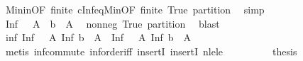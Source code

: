\begin{isabellebody}
\ Min{\isacharunderscore}{\kern0pt}in{\isacharbrackleft}{\kern0pt}OF\ finite{\isacharbrackright}{\kern0pt}\ cInf{\isacharunderscore}{\kern0pt}eq{\isacharunderscore}{\kern0pt}Min{\isacharbrackleft}{\kern0pt}OF\ finite{\isacharbrackright}{\kern0pt}\ True\ partition\ \isamarkupfalse%
\ simp\isanewline
\ \ \ \ \ \ \isamarkupfalse%
\ \isamarkupfalse%
\ {\isachardoublequoteopen}Inf\ {\isacharparenleft}{\kern0pt}{\isacharbraceleft}{\kern0pt}{}{\isachardot}{\kern0pt}{\isachardot}{\kern0pt}{\isacharbraceright}{\kern0pt}\ {\isasyminter}\ A{\isacharparenright}{\kern0pt}\ {\isasymin}\ {\isacharparenleft}{\kern0pt}{\isacharbraceleft}{\kern0pt}b{\isachardot}{\kern0pt}{\isachardot}{\kern0pt}{\isacharbraceright}{\kern0pt}\ {\isasyminter}\ A{\isacharparenright}{\kern0pt}{\isachardoublequoteclose}\ \isamarkupfalse%
\ nonneg\ True\ partition\ \isamarkupfalse%
\ blast\isanewline
\ \ \ \ \ \ \isamarkupfalse%
\ \isamarkupfalse%
\ {\isachardoublequoteopen}inf\ {\isacharparenleft}{\kern0pt}Inf\ {\isacharparenleft}{\kern0pt}{\isacharbraceleft}{\kern0pt}{}{\isachardot}{\kern0pt}{\isachardot}{\kern0pt}{\isacharbraceright}{\kern0pt}\ {\isasyminter}\ A{\isacharparenright}{\kern0pt}{\isacharparenright}{\kern0pt}\ {\isacharparenleft}{\kern0pt}Inf\ {\isacharparenleft}{\kern0pt}{\isacharbraceleft}{\kern0pt}b{\isachardot}{\kern0pt}{\isachardot}{\kern0pt}{\isacharless}{\kern0pt}{}{\isacharbraceright}{\kern0pt}\ {\isasyminter}\ A{\isacharparenright}{\kern0pt}{\isacharparenright}{\kern0pt}\ {\isasymin}\ {\isacharbraceleft}{\kern0pt}Inf\ {\isacharparenleft}{\kern0pt}{\isacharbraceleft}{\kern0pt}{}{\isachardot}{\kern0pt}{\isachardot}{\kern0pt}{\isacharbraceright}{\kern0pt}\ {\isasyminter}\ A{\isacharparenright}{\kern0pt}{\isacharcomma}{\kern0pt}\ Inf\ {\isacharparenleft}{\kern0pt}{\isacharbraceleft}{\kern0pt}b{\isachardot}{\kern0pt}{\isachardot}{\kern0pt}{\isacharless}{\kern0pt}{}{\isacharbraceright}{\kern0pt}\ {\isasyminter}\ A{\isacharparenright}{\kern0pt}{\isacharbraceright}{\kern0pt}{\isachardoublequoteclose}\ \isamarkupfalse%
\ {\isacharparenleft}{\kern0pt}metis\ inf{\isachardot}{\kern0pt}commute\ inf{\isachardot}{\kern0pt}order{\isacharunderscore}{\kern0pt}iff\ insertI{}\ insertI{}\ nle{\isacharunderscore}{\kern0pt}le{\isacharparenright}{\kern0pt}\isanewline
\ \ \ \ \ \ \isamarkupfalse%
\ \isamarkupfalse%
\ {\isacharquery}{\kern0pt}thesis\ \isamarkupfalse%

\end{isabellebody}
